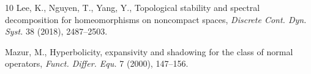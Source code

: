\documentclass[11pt,letterpaper]{amsart}
\numberwithin{equation}{section}
\begin{document}
\begin{thebibliography}{10}
Lee, K., Nguyen, T., Yang, Y.,
Topological stability and spectral decomposition for homeomorphisms on noncompact spaces,
{\em Discrete Cont. Dyn. Syst.} 38 (2018), 2487--2503.



Mazur, M.,
Hyperbolicity, expansivity and shadowing for the class of normal operators,
{\em Funct. Differ. Equ.} 7 (2000), 147--156.














\end{thebibliography}
\end{document}
